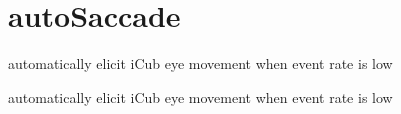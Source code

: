 \hypertarget{group__autoSaccade}{\section{auto\-Saccade}
\label{group__autoSaccade}
}


automatically elicit i\-Cub eye movement when event rate is low  


automatically elicit i\-Cub eye movement when event rate is low 
